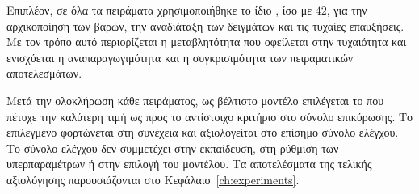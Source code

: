 Επιπλέον, σε όλα τα πειράματα χρησιμοποιήθηκε το ίδιο , ίσο με \(42\), για την αρχικοποίηση των
βαρών, την αναδιάταξη των δειγμάτων και τις τυχαίες επαυξήσεις. Με τον
τρόπο αυτό περιορίζεται η μεταβλητότητα που οφείλεται στην τυχαιότητα
και ενισχύεται η αναπαραγωγιμότητα και η συγκρισιμότητα των
πειραματικών αποτελεσμάτων.

Μετά την ολοκλήρωση κάθε πειράματος, ως βέλτιστο μοντέλο επιλέγεται το
 που πέτυχε την καλύτερη τιμή ως προς το αντίστοιχο
κριτήριο στο σύνολο επικύρωσης. Το επιλεγμένο  φορτώνεται
στη συνέχεια και αξιολογείται στο επίσημο σύνολο ελέγχου. Το σύνολο ελέγχου δεν συμμετέχει στην εκπαίδευση,
στη ρύθμιση των υπερπαραμέτρων ή στην επιλογή του μοντέλου. Τα
αποτελέσματα της τελικής αξιολόγησης παρουσιάζονται στο
Κεφάλαιο~\ref{ch:experiments}.
